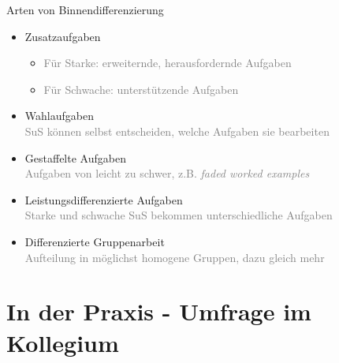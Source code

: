 \documentclass{beamer}
\newcommand{\ppause}{}
\newcommand{\lowlight}[1]{\textcolor{gray}{#1}}
\begin{document}
	\begin{frame}[t]{Arten von Binnendifferenzierung}
		\begin{itemize}
			\item Zusatzaufgaben
			\ppause
			\begin{itemize}
				\item[] \lowlight{Für Starke: erweiternde, herausfordernde Aufgaben}
				\ppause
				\item[] \lowlight{Für Schwache: unterstützende Aufgaben}
				\ppause
			\end{itemize}
			
			\item Wahlaufgaben\\
			\ppause
			\hspace{.7cm} \lowlight{SuS können selbst entscheiden, welche Aufgaben sie bearbeiten}
			
			\ppause
			\item Gestaffelte Aufgaben\\
			\ppause
			\hspace{.7cm} \lowlight{Aufgaben von leicht zu schwer, z.B. \textit{faded worked examples}}
			
			\ppause
			\item Leistungsdifferenzierte Aufgaben\\
			\ppause
			\hspace{.7cm} \lowlight{Starke und schwache SuS bekommen unterschiedliche Aufgaben}
			
			\ppause
			
			\item Differenzierte Gruppenarbeit\\
			\ppause
			\hspace{.7cm} \lowlight{Aufteilung in möglichst homogene Gruppen, dazu gleich mehr}
		\end{itemize}
	\end{frame}
	
	\section{In der Praxis - Umfrage im Kollegium}
	
\end{document}
